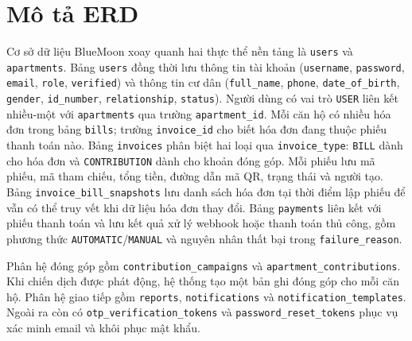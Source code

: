﻿\documentclass[12pt,a4paper]{report}
\newcommand{\projectname}{BlueMoon}
\begin{document}
\section{Mô tả ERD}
Cơ sở dữ liệu \projectname{} xoay quanh hai thực thể nền tảng là \texttt{users} và \texttt{apartments}. Bảng \texttt{users} đồng thời lưu thông tin tài khoản (\texttt{username}, \texttt{password}, \texttt{email}, \texttt{role}, \texttt{verified}) và thông tin cư dân (\texttt{full\_name}, \texttt{phone}, \texttt{date\_of\_birth}, \texttt{gender}, \texttt{id\_number}, \texttt{relationship}, \texttt{status}). Người dùng có vai trò \texttt{USER} liên kết nhiều-một với \texttt{apartments} qua trường \texttt{apartment\_id}. Mỗi căn hộ có nhiều hóa đơn trong bảng \texttt{bills}; trường \texttt{invoice\_id} cho biết hóa đơn đang thuộc phiếu thanh toán nào. Bảng \texttt{invoices} phân biệt hai loại qua \texttt{invoice\_type}: \texttt{BILL} dành cho hóa đơn và \texttt{CONTRIBUTION} dành cho khoản đóng góp. Mỗi phiếu lưu mã phiếu, mã tham chiếu, tổng tiền, đường dẫn mã QR, trạng thái và người tạo. Bảng \texttt{invoice\_bill\_snapshots} lưu danh sách hóa đơn tại thời điểm lập phiếu để vẫn có thể truy vết khi dữ liệu hóa đơn thay đổi. Bảng \texttt{payments} liên kết với phiếu thanh toán và lưu kết quả xử lý webhook hoặc thanh toán thủ công, gồm phương thức \texttt{AUTOMATIC}/\texttt{MANUAL} và nguyên nhân thất bại trong \texttt{failure\_reason}.

Phân hệ đóng góp gồm \texttt{contribution\_campaigns} và \texttt{apartment\_contributions}. Khi chiến dịch được phát động, hệ thống tạo một bản ghi đóng góp cho mỗi căn hộ. Phân hệ giao tiếp gồm \texttt{reports}, \texttt{notifications} và \texttt{notification\_templates}. Ngoài ra còn có \texttt{otp\_verification\_tokens} và \texttt{password\_reset\_tokens} phục vụ xác minh email và khôi phục mật khẩu.
\end{document}

